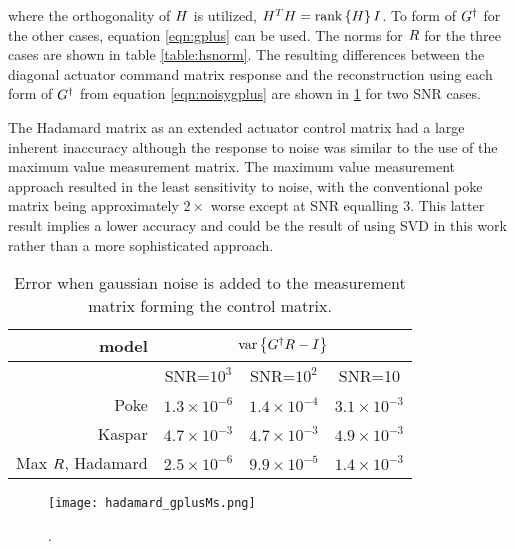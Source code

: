 \documentclass[a4paper]{article}
\begin{document}
where the orthogonality of $\mathnormal{H}$ is utilized,
$\mathnormal{H}^{T}\mathnormal{H}=\mathrm{rank}\left\{\mathnormal{H}\right\}\mathnormal{I}$. To
form of $\mathnormal{G}^{\dagger}$ for the other cases, equation \ref{eqn:gplus}
can be used. The norms for $\mathnormal{R}$ for the three cases are shown in table
\ref{table:hsnorm}. The resulting differences between the diagonal actuator
command matrix response and the reconstruction using each form of
$\mathnormal{G}^{\dagger}$ from equation \ref{eqn:noisygplus} are shown in
\ref{table:snrres} for two SNR cases.

The Hadamard matrix as an extended actuator control matrix had a large inherent
inaccuracy although the response to noise was similar to the use of the maximum
value measurement matrix. The maximum value measurement approach resulted in
the least sensitivity to noise, with the conventional poke matrix being
approximately $2\times$ worse except at SNR equalling 3. This latter result
implies a lower accuracy and could be the result of using SVD in this work
rather than a more sophisticated approach.

\begin{table}
\begin{center}\begin{tabular}{r|c|c|c} \hline
   \textbf{model}             & \multicolumn{3}{c}{
      $\mbox{var}\left\{\mathnormal{G}^{\dagger}\mathnormal{R}-\mathnormal{I}\right\}$}
                                                                        \\ \hline
            & SNR=$10^{3}$       & SNR=$10^{2}$       & SNR=10          \\ \hline
   Poke     & $1.3\times10^{-6}$ & $1.4\times10^{-4}$ & $3.1\times10^{-3}$ \\
   Kaspar   & $4.7\times10^{-3}$ & $4.7\times10^{-3}$ & $4.9\times10^{-3}$ \\
   Max $\mathnormal{R}$, Hadamard 
            & $2.5\times10^{-6}$ & $9.9\times10^{-5}$ & $1.4\times10^{-3}$ \\
            \hline 
\end{tabular}\end{center}
   \caption{Error when gaussian noise is added to the measurement matrix forming
   the control matrix.
   \label{table:snrres}}
\end{table}

\begin{figure} \begin{center}
   \texttt{[image: hadamard\_gplusMs.png]} 
   \caption{.
  \label{fig:gplusms}}
\end{center} \end{figure} 
\end{document}
